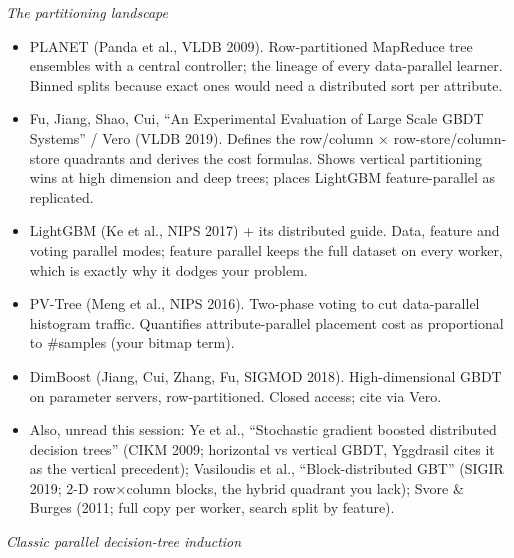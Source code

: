 \documentclass[sigconf,screen]{acmart}
\begin{document}
\textit{The partitioning landscape}

\begin{itemize}
    \item PLANET (Panda et al., VLDB 2009). Row-partitioned MapReduce tree ensembles with a central controller; the lineage of every data-parallel learner. Binned splits because exact ones would need a distributed sort per attribute.
    \item Fu, Jiang, Shao, Cui, “An Experimental Evaluation of Large Scale GBDT Systems” / Vero (VLDB 2019). Defines the row/column × row-store/column-store quadrants and derives the cost formulas. Shows vertical partitioning wins at high dimension and deep trees; places LightGBM feature-parallel as replicated.
    \item LightGBM (Ke et al., NIPS 2017) + its distributed guide. Data, feature and voting parallel modes; feature parallel keeps the full dataset on every worker, which is exactly why it dodges your problem.
    \item PV-Tree (Meng et al., NIPS 2016). Two-phase voting to cut data-parallel histogram traffic. Quantifies attribute-parallel placement cost as proportional to \#samples (your bitmap term).
    \item DimBoost (Jiang, Cui, Zhang, Fu, SIGMOD 2018). High-dimensional GBDT on parameter servers, row-partitioned. Closed access; cite via Vero.
    \item Also, unread this session: Ye et al., “Stochastic gradient boosted distributed decision trees” (CIKM 2009; horizontal vs vertical GBDT, Yggdrasil cites it as the vertical precedent); Vasiloudis et al., “Block-distributed GBT” (SIGIR 2019; 2-D row×column blocks, the hybrid quadrant you lack); Svore \& Burges (2011; full copy per worker, search split by feature).
\end{itemize}

\textit{Classic parallel decision-tree induction}
\end{document}
